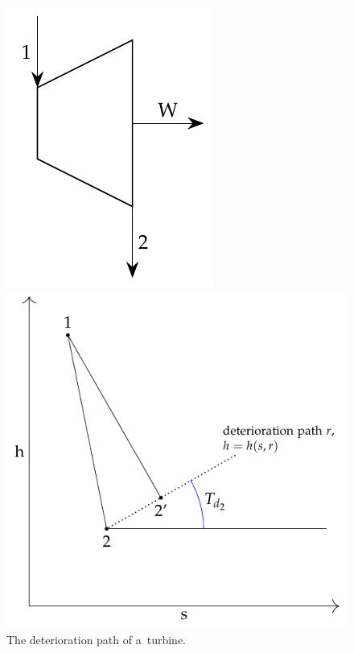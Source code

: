 \documentclass[energies,article,accept,moreauthors,pdftex]{Definitions/mdpi}
\begin{document}
\begin{figure}[H]
	\begin{minipage}[c]{0.48\linewidth}
		\centering
		\includegraphics[scale=0.8]{turbinew}
	\end{minipage}
	\begin{minipage}[c]{0.48\linewidth}
		\centering
		\includegraphics[scale=0.8]{dt1}
	\end{minipage}
	\caption{The deterioration path of a~turbine.}
	\label{fig:dt1}
\end{figure}
\end{document}
